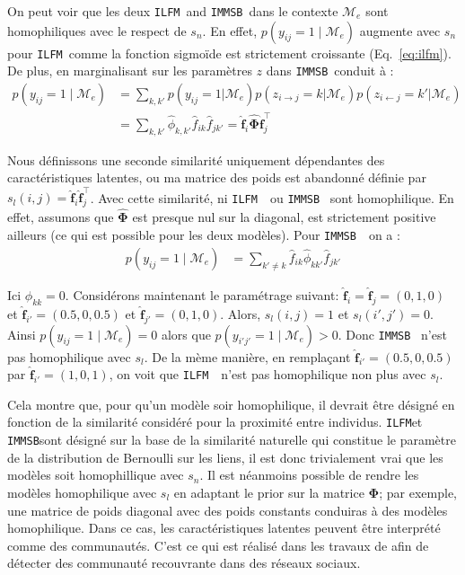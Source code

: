 \documentclass[french]{hermes-journal}
\newcommand{\ilfm}{\texttt{ILFM}}
\newcommand{\immsb}{\texttt{IMMSB}}
\newcommand{\pr}{p}
\newcommand{\M}{\mathcal{M}}
\newcommand{\mat}[1]{\bm{#1}}
\begin{document}
On peut voir que les deux \ilfm\ and \immsb\, dans le contexte $\mathcal{M}_e$ sont homophiliques avec le respect de $s_n$. En effet, $\pr(y_{ij}=1 \mid \mathcal{M}_e)$ augmente avec $s_n$  pour  \ilfm\ comme la fonction sigmoïde est strictement croissante (Eq.~\ref{eq:ilfm}). De plus, en marginalisant sur les paramètres $z$ dans \immsb\ conduit à :
\begin{align}
    \pr(y_{ij} =1 \mid \mathcal{M}_e) & = \sum_{k,k'} \pr(y_{ij}=1|\mathcal{M}_e) \pr(z_{i \rightarrow j}=k | \mathcal{M}_e) \pr(z_{i \leftarrow j}=k' | \mathcal{M}_e) \nonumber \\
& = \sum_{k,k'} \hat{\phi}_{k,k'} \hat{f}_{ik} \hat{f}_{jk'} = \mat{\hat{f}}_{i} \mat{\hat{\Phi}} \mat{\hat{f}}_j^\top \nonumber
\end{align}


Nous définissons une seconde similarité uniquement dépendantes des caractéristiques latentes, ou ma matrice des poids est abandonné définie par $s_l(i,j) = \mat{\hat{f}}_{i} \mat{\hat{f}}_j^\top$. Avec cette similarité, ni \ilfm~ ou \immsb~ sont homophilique. En effet, assumons que $\mat{\hat{\Phi}}$ est presque nul sur la diagonal, est strictement positive ailleurs (ce qui est possible pour les deux modèles). Pour \immsb~ on a :
\begin{align*} 
\pr(y_{ij}=1 \mid \M_e) & = \sum_{k' \neq k} \hat{f}_{ik} \hat{\phi}_{kk'} \hat{f}_{jk'}
\end{align*}


Ici $\hat{\phi}_{kk} = 0$.  Considérons maintenant le paramétrage suivant: $\mat{\hat{f}}_i=\mat{\hat{f}}_j=(0,1,0)$ et $\mat{\hat{f}}_{i'}=(0.5,0,0.5)$ et $\mat{\hat{f}}_{j'}=(0,1,0)$. Alors, $s_l(i,j)=1$ et $s_l(i',j')=0$. Ainsi $\pr(y_{ij}=1 \mid \M_e) = 0$ alors que $\pr(y_{i'j'}=1 \mid \M_e) > 0$. Donc \immsb~ n'est pas homophilique avec $s_l$. De la mème manière, en remplaçant $\mat{\hat{f}}_{i'}=(0.5,0,0. 5)$ par $\mat{\hat{f}}_{i'}=(1,0,1)$, on voit que \ilfm~ n'est pas homophilique non plus avec $s_l$.

Cela montre que, pour qu'un modèle soir homophilique, il devrait être désigné en fonction de la similarité considéré pour la proximité entre individus. \ilfm et \immsb sont désigné sur la base de la similarité naturelle qui constitue le paramètre de la distribution de Bernoulli sur les liens, il est donc trivialement vrai que les modèles soit homophillique avec $s_n$. Il est néanmoins possible de rendre les modèles homophilique avec $s_l$ en adaptant le prior sur la matrice $\mat{\Phi}$; par exemple, une matrice de poids diagonal avec des poids constants conduiras à des modèles homophilique. Dans ce cas, les caractéristiques latentes peuvent être interprété comme des communautés. C'est ce qui est réalisé dans les travaux de \cite{AMMSB} afin de détecter des communauté recouvrante dans des réseaux sociaux.
\end{document}
